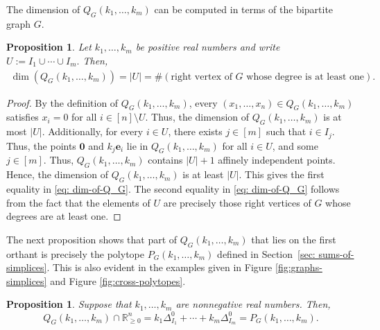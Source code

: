 \documentclass[11pt,a4paper]{article}
\newcommand{\vct}[1]{\boldsymbol{#1}}
\newcommand{\R}{\mathbb{R}}
\newcommand{\1}{\mathbf{1}}
\theoremstyle{plain}
\newtheorem{proposition}[theorem]{Proposition}
\theoremstyle{definition}
\begin{document}
The dimension of $Q_G(k_1,\dots,k_m)$ can be computed in terms of the bipartite graph $G$.
\begin{proposition}\label{prop:dim-of-Q_G}
Let $k_1,\ldots,k_m$ be positive real numbers and write $U := I_1\cup \cdots \cup I_m.$ Then,
\begin{align}\label{eq: dim-of-Q_G}
\dim(Q_G(k_1,\ldots,k_m)) = |U| = \#(\text{right vertex of $G$ whose degree is at least one}).
\end{align}
\end{proposition}
\begin{proof}
By the definition of $Q_G(k_1, \dots, k_m)$, every $(x_1, \dots, x_n) \in Q_G(k_1, \dots, k_m)$ satisfies $x_i = 0$ for all $i \in [n]\setminus U.$ Thus, the dimension of $Q_G(k_1, \dots, k_m)$ is at most $|U|$. Additionally, for every $i \in U$, there exists $j \in [m]$ such that $i \in I_j$. Thus, the points $\vct{0}$ and $k_j\vct{e}_i$ lie in $Q_G(k_1, \dots, k_m)$ for all $i \in U$, and some $j \in [m]$. Thus, $Q_G(k_1, \dots, k_m)$ contains $|U|+1$ affinely independent points. Hence, the dimension of $Q_G(k_1, \dots, k_m)$ is at least $|U|.$ This gives the first equality in \eqref{eq: dim-of-Q_G}. The second equality in \eqref{eq: dim-of-Q_G} follows from the fact that the elements of $U$ are precisely those right vertices of $G$ whose degrees are at least one.
\end{proof}


The next proposition shows that part of $Q_G(k_1, \dots, k_m)$ that lies on the first orthant is precisely the polytope $P_G(k_1, \dots, k_m)$ defined in Section~\ref{sec: sums-of-simplices}. This is also evident in the examples given in Figure \ref{fig:graphs-simplices} and Figure \ref{fig:cross-polytopes}. 

\begin{proposition}\label{prop: Q_G-first-orthant}
Suppose that $k_1,\ldots,k_m$ are nonnegative real numbers. Then,
\[
Q_G(k_1,\ldots,k_m)\cap\R_{\ge 0}^n
=k_1\Delta_{I_1}^0+\cdots+k_m\Delta_{I_m}^0 = P_G(k_1, \dots, k_m).
\]
\end{proposition}
\end{document}

